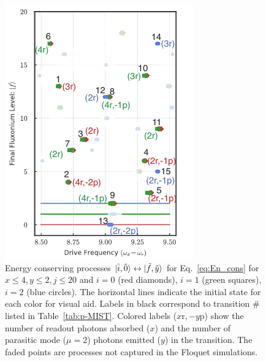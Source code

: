 \documentclass[%
reprint,
superscriptaddress,
 amsmath,amssymb,
 aps,
 prx,
longbibliography,
floatfix,
]{revtex4-2}
\begin{document}
\begin{figure}[!htb]
    \centering
    \includegraphics[width=\linewidth]{Figures/Trans_.pdf}
    \caption{Energy conserving processes $\ket{\tilde{i},\tilde{0}}\leftrightarrow\ket{\tilde{f},\tilde{y}}$ for Eq.~\ref{eq:En_cons} for $x\le 4, y\le 2, j\le 20$ and $i=0$ (red diamonds), $i=1$ (green squares), $i=2$ (blue circles). The horizontal lines indicate the initial state for each color for visual aid. Labels in black correspond to transition $\#$ listed in Table~\ref{tab:p-MIST}. Colored labels ($x \mathrm{r},-y \mathrm{p}$) show the number of readout photons absorbed ($x$) and the number of parasitic mode ($\mu=2$) photons emitted ($y$) in the transition. The faded points are processes not captured in the Floquet simulations.}
    \label{fig:trans_prof}
\end{figure}
\end{document}
